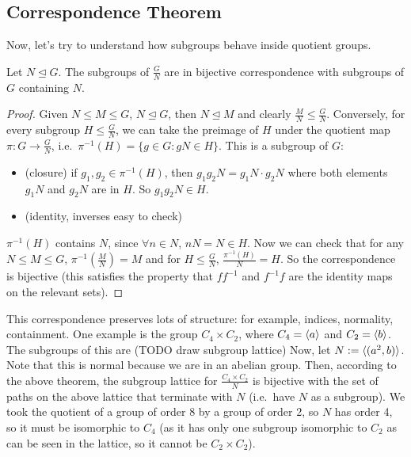 \subsection{Correspondence Theorem}
Now, let's try to understand how subgroups behave inside quotient groups.
\begin{theorem}
	Let \(N \trianglelefteq G\). The subgroups of \(\frac{G}{N}\) are in bijective correspondence with subgroups of \(G\) containing \(N\).
\end{theorem}
\begin{proof}
	Given \(N \leq M \leq G\), \(N \trianglelefteq G\), then \(N \trianglelefteq M\) and clearly \(\frac{M}{N} \leq \frac{G}{N}\). Conversely, for every subgroup \(H \leq \frac{G}{N}\), we can take the preimage of \(H\) under the quotient map \(\pi : G \to \frac{G}{N}\), i.e.\ \(\pi^{-1}(H) = \{ g \in G : gN \in H \}\). This is a subgroup of \(G\):
	\begin{itemize}
		\item (closure) if \(g_1, g_2 \in \pi^{-1}(H)\), then \(g_1g_2N = g_1N\cdot g_2N\) where both elements \(g_1N\) and \(g_2N\) are in \(H\). So \(g_1g_2N \in H\).
		\item (identity, inverses easy to check)
	\end{itemize}
	\(\pi^{-1}(H)\) contains \(N\), since \(\forall n \in N\), \(nN = N \in H\). Now we can check that for any \(N \leq M \leq G\), \(\pi^{-1}(\frac{M}{N}) = M\) and for \(H \leq \frac{G}{N}\), \(\frac{\pi^{-1}(H)}{N} = H\). So the correspondence is bijective (this satisfies the property that \(ff^{-1}\) and \(f^{-1}f\) are the identity maps on the relevant sets).
\end{proof}
This correspondence preserves lots of structure: for example, indices, normality, containment. One example is the group \(C_4 \times C_2\), where \(C_4 = \langle{} a \rangle\) and \(C_2 = \langle{} b \rangle\). The subgroups of this are (TODO draw subgroup lattice)
Now, let \(N := \langle{} (a^2, b) \rangle\). Note that this is normal because we are in an abelian group. Then, according to the above theorem, the subgroup lattice for \(\frac{C_4 \times C_2}{N}\) is bijective with the set of paths on the above lattice that terminate with \(N\) (i.e.\ have \(N\) as a subgroup).
We took the quotient of a group of order 8 by a group of order 2, so \(N\) has order 4, so it must be isomorphic to \(C_4\) (as it has only one subgroup isomorphic to \(C_2\) as can be seen in the lattice, so it cannot be \(C_2 \times C_2\)).

